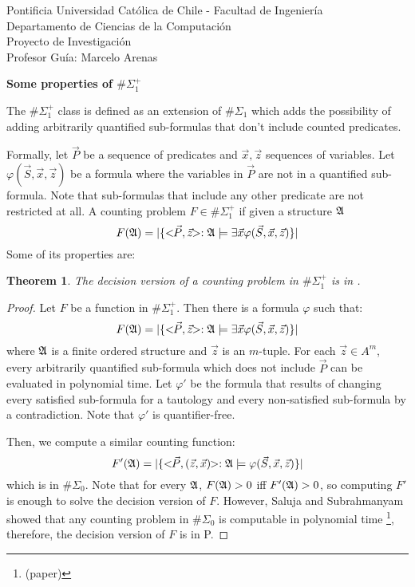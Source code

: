 \documentclass[12pt]{article}
\def\A{{\frak A}}
\newtheorem{theo}{Theorem}
\begin{document}
\begin{flushleft}
{\footnotesize Pontificia Universidad Cat\'olica de Chile - Facultad de Ingenier\'ia\\
Departamento de Ciencias de la Computaci\'on\\
Proyecto de Investigaci\'on\\
Profesor Gu\'ia: Marcelo Arenas\\
}
\end{flushleft}
\begin{center}
{ \LARGE \bf
  Some properties of $\#\Sigma_1^{+}$
}
\end{center}

The $\#\Sigma_1^{+}$ class is defined as an extension of $\#\Sigma_1$ which adds the possibility of adding arbitrarily quantified sub-formulas that don't include counted predicates.

Formally, let $\vec{P}$ be a sequence of predicates and $\vec{x},\vec{z}$ sequences of variables. Let $\varphi(\vec{S},\vec{x},\vec{z})$ be a formula where the variables in $\vec{P}$ are not in a quantified sub-formula. Note that sub-formulas that include any other predicate are not restricted at all. A counting problem $F \in \#\Sigma_1^{+}$ if given a structure $\A$
$$
F(\A) = \vert \{ <\!\!\vec{P},\vec{z}\!\!> :\A \models \exists \vec{x} \varphi(\vec{S},\vec{x},\vec{z}) \} \vert
$$ 
Some of its properties are:

\begin{theo}
The decision version of a counting problem in $\#\Sigma_1^{+}$ is in .
\end{theo}
\begin{proof}
Let $F$ be a function in $\#\Sigma_1^{+}$. Then there is a formula $\varphi$ such that:
$$
F(\A) = \vert \{ <\!\!\vec{P},\vec{z}\!\!> :\A \models \exists \vec{x} \varphi(\vec{S},\vec{x},\vec{z}) \} \vert
$$ 
where $\A$ is a finite ordered structure and $\vec{z}$ is an $m$-tuple. For each $\vec{z} \in A^m$, every arbitrarily quantified sub-formula which does not include $\vec{P}$ can be evaluated in polynomial time. Let $\varphi'$ be the formula that results of changing every satisfied sub-formula for a tautology and every non-satisfied sub-formula by a contradiction. Note that $\varphi'$ is quantifier-free.

Then, we compute a similar counting function:
$$
F'(\A) = \vert \{ <\!\!\vec{P},(\vec{z},\vec{x})\!\!> :\A \models \varphi(\vec{S},\vec{x},\vec{z}) \} \vert
$$ 
which is in $\#\Sigma_0$. Note that for every $\A$, $F(\A) > 0$ iff $F'(\A) > 0$, so computing $F'$ is enough to solve the decision version of $F$. However, Saluja and Subrahmanyam showed that any counting problem in $\#\Sigma_0$ is computable in polynomial time \footnote[1]{(paper)}, therefore, the decision version of $F$ is in P.
\end{proof}
\end{document}
